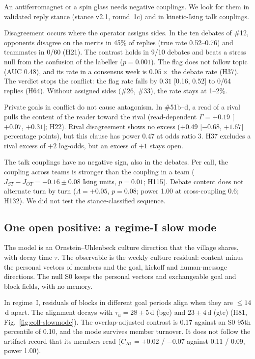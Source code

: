 An antiferromagnet or a spin glass needs negative couplings.
We look for them in validated reply stance (stance v2.1, round~1c) and in kinetic-Ising talk couplings.

Disagreement occurs where the operator assigns sides.
In the ten debates of \#12, opponents disagree on the merits in 45\% of replies (true rate 0.52--0.76) and teammates in 0/60 (H21).
The contrast holds in 9/10 debates and beats a stress null from the confusion of the labeller ($p=0.001$).
The flag does not follow topic (AUC 0.48), and its rate in a consensus week is $0.05\times$ the debate rate (H37).
The verdict stops the conflict: the flag rate falls by $0.31$ [0.16, 0.52] to 0/64 replies (H64).
Without assigned sides (\#26, \#33), the rate stays at 1--2\%.

Private goals in conflict do not cause antagonism.
In \#51b--d, a read of a rival pulls the content of the reader toward the rival (read-dependent $\Gamma=+0.19$ [$+0.07$, $+0.31$]; H22).
Rival disagreement shows no excess ($+0.49$ [$-0.68$, $+1.67$] percentage points), but this clause has power 0.47 at odds ratio 3.
H37 excludes a rival excess of $+2$ log-odds, but an excess of $+1$ stays open.

The talk couplings have no negative sign, also in the debates.
Per call, the coupling across teams is stronger than the coupling in a team ($J_{ST}-J_{OT}=-0.16\pm0.08$ Ising units, $p=0.01$; H115).
Debate content does not alternate turn by turn ($\Lambda=+0.05$, $p=0.08$; power 1.00 at cross-coupling 0.6; H132).
We did not test the stance-classified sequence.

\subsection{One open positive: a regime-I slow mode}
\label{sec:coll-slowmode}

The model is an Ornstein--Uhlenbeck culture direction that the village shares, with decay time $\tau$.
The observable is the weekly culture residual: content minus the personal vectors of members and the goal, kickoff and human-message directions.
The null S0 keeps the personal vectors and exchangeable goal and block fields, with no memory.

In regime~I, residuals of blocks in different goal periods align when they are $\le14$\,d apart.
The alignment decays with $\tau_u=28\pm5$\,d (bge) and $23\pm4$\,d (gte) (H81, Fig.~\ref{fig:coll-slowmode}).
The overlap-adjusted contrast is 0.17 against an S0 95th percentile of 0.10, and the mode survives member turnover.
It does not follow the artifact record that its members read ($C_{R1}=+0.02$ / $-0.07$ against 0.11 / 0.09, power 1.00).

